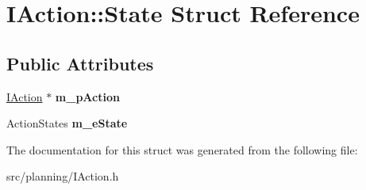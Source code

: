 \hypertarget{struct_i_action_1_1_state}{}\section{I\+Action\+:\+:State Struct Reference}
\label{struct_i_action_1_1_state}
\subsection*{Public Attributes}
\begin{DoxyCompactItemize}
\item 
\mbox{\label{struct_i_action_1_1_state_a5530a7088ba0caa7c5e99b2431fdc209}} 
\hyperlink{class_i_action}{I\+Action} $\ast$ {\bfseries m\+\_\+p\+Action}
\item 
\mbox{\label{struct_i_action_1_1_state_af5e91a8a7841864f5db28268176303f5}} 
Action\+States {\bfseries m\+\_\+e\+State}
\end{DoxyCompactItemize}


The documentation for this struct was generated from the following file\+:\begin{DoxyCompactItemize}
\item 
src/planning/I\+Action.\+h\end{DoxyCompactItemize}
